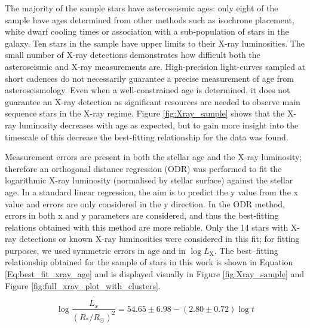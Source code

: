 The majority of the sample stars have asteroseismic ages: only eight of the sample have ages determined from other methods such as isochrone placement, white dwarf cooling times or association with a sub-population of stars in the galaxy. Ten stars in the sample have upper limits to their X-ray luminosities. The small number of X-ray detections demonstrates how difficult both the asteroseismic and X-ray measurements are. High-precision light-curves sampled at short cadences do not necessarily guarantee a precise measurement of age from asteroseismology. Even when a well-constrained age is determined, it does not guarantee an X-ray detection as significant resources are needed to observe main sequence stars in the X-ray regime. Figure \ref{fig:Xray_sample} shows that the X-ray luminosity decreases with age as expected, but to gain more insight into the timescale of this decrease the best-fitting relationship for the data was found.

Measurement errors are present in both the stellar age and the X-ray luminosity; therefore an orthogonal distance regression (ODR) \citep{Boggs_Rogers_1990} was performed to fit the logarithmic X-ray luminosity (normalised by stellar surface) against the stellar age. In a standard linear regression, the aim is to predict the y value from the x value and errors are only considered in the y direction. In the ODR method, errors in both x and y parameters are considered, and thus the best-fitting relations obtained with this method are more reliable. Only the 14 stars with X-ray detections or known X-ray luminosities were considered in this fit; for fitting purposes, we used symmetric errors in age and in $\log L_{\mathrm{X}}$. The best--fitting relationship obtained for the sample of stars in this work is shown in Equation \ref{Eq:best_fit_xray_age} and is displayed visually in Figure \ref{fig:Xray_sample} and Figure \ref{fig:full_xray_plot_with_clusters}.

\begin{equation}
	\log\frac{L_{x}}{(R_\ast/R_\odot)^{2}} = 54.65 \pm 6.98 - (2.80 \pm 0.72)\log t
	\label{Eq:best_fit_xray_age}
\end{equation}

